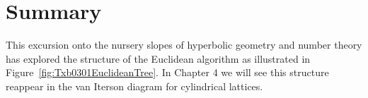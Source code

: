 \section{Summary}
This excursion onto the nursery slopes of hyperbolic geometry and number theory has explored the structure of the Euclidean algorithm as illustrated in Figure~\ref{fig:Txb0301EuclideanTree}. In Chapter 4 we will see this structure reappear in the van Iterson diagram for cylindrical lattices. 

